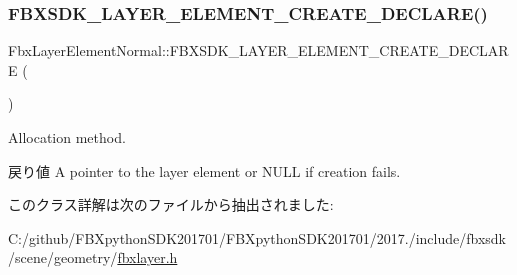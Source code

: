 \subsubsection{\texorpdfstring{F\+B\+X\+S\+D\+K\+\_\+\+L\+A\+Y\+E\+R\+\_\+\+E\+L\+E\+M\+E\+N\+T\+\_\+\+C\+R\+E\+A\+T\+E\+\_\+\+D\+E\+C\+L\+A\+R\+E()}{FBXSDK\_LAYER\_ELEMENT\_CREATE\_DECLARE()}}
{\footnotesize\ttfamily Fbx\+Layer\+Element\+Normal\+::\+F\+B\+X\+S\+D\+K\+\_\+\+L\+A\+Y\+E\+R\+\_\+\+E\+L\+E\+M\+E\+N\+T\+\_\+\+C\+R\+E\+A\+T\+E\+\_\+\+D\+E\+C\+L\+A\+RE (\begin{DoxyParamCaption}\item[{Layer\+Element\+Normal}]{ }\end{DoxyParamCaption})}

Allocation method. \begin{DoxyReturn}{戻り値}
A pointer to the layer element or {\ttfamily N\+U\+LL} if creation fails. 
\end{DoxyReturn}


このクラス詳解は次のファイルから抽出されました\+:\begin{DoxyCompactItemize}
\item 
C\+:/github/\+F\+B\+Xpython\+S\+D\+K201701/\+F\+B\+Xpython\+S\+D\+K201701/2017./include/fbxsdk/scene/geometry/\hyperlink{fbxlayer_8h}{fbxlayer.\+h}\end{DoxyCompactItemize}

